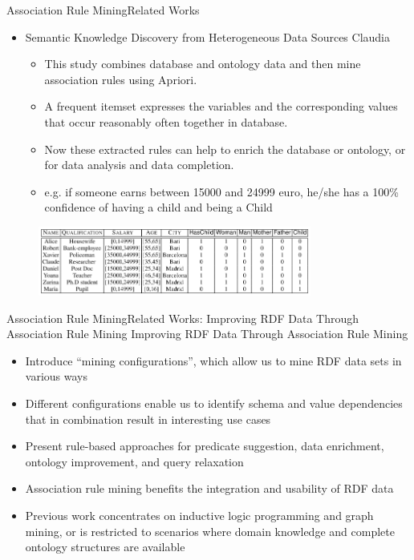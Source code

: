 \documentclass[10pt]{beamer}
\begin{document}
\begin{frame}{Association Rule Mining}{Related Works}
\begin{itemize}
\item Semantic Knowledge Discovery from Heterogeneous Data Sources
Claudia \cite{d2012semantic}
\begin{itemize}
\item This study combines database and ontology data and then mine association rules using Apriori.
\item A frequent itemset expresses the variables and the corresponding values that occur reasonably often together in database.
\item Now these extracted rules can help to enrich the database or ontology, or for data analysis and data completion.
\item e.g. if someone earns between 15000 and 24999 euro, he/she has a 100\% confidence of having a child and being a Child
\end{itemize}
\end{itemize}
\begin{figure}[H]
	\centering
	\includegraphics[width=0.8\textwidth]{images/Database.PNG}
	\label{fig:Database}
 
\end{figure}
\end{frame}

\begin{frame}{Association Rule Mining}{Related Works:  Improving RDF Data Through Association Rule Mining}
Improving RDF Data Through Association Rule Mining \cite{abedjan2013improving}
\begin{itemize}
	
	\item Introduce “mining configurations”, which allow us to mine RDF data sets in various ways
	\item Different configurations enable us to identify schema and value dependencies that in combination result in interesting use cases
	\item Present rule-based approaches for predicate suggestion, data enrichment, ontology improvement, and query relaxation
	\item Association rule mining benefits the integration and usability of RDF data
	\item Previous work concentrates on inductive logic programming and graph mining, or is restricted to scenarios where domain knowledge and complete ontology structures are available
\end{itemize}
\end{frame}
 
\end{document}
